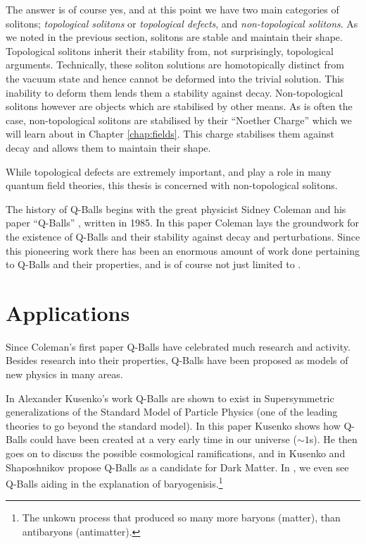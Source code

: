 The answer is of course yes, and at this point we have two main categories of solitons; \textit{topological solitons} or \textit{topological defects}, and \textit{non-topological solitons}. As we noted in the previous section, solitons are stable and maintain their shape. Topological solitons inherit their stability from, not surprisingly, topological arguments. Technically, these soliton solutions are homotopically distinct from the vacuum state \cite{nakahara} and hence cannot be deformed into the trivial solution. This inability to deform them lends them a stability against decay. Non-topological solitons however are objects which are stabilised by other means. As is often the case, non-topological solitons are stabilised by their ``Noether Charge'' which we will learn about in Chapter \ref{chap:fields}. This charge stabilises them against decay and allows them to maintain their shape.

While topological defects are extremely important, and play a role in many quantum field theories, this thesis is concerned with non-topological solitons.

The history of Q-Balls begins with the great physicist Sidney Coleman and his paper ``Q-Balls'' \cite{coleman}, written in 1985. In this paper Coleman lays the groundwork for the existence of Q-Balls and their stability against decay and perturbations. Since this pioneering work there has been an enormous amount of work done pertaining to Q-Balls and their properties, and is of course not just limited to \cite{qball1,qball2,qball3,qball4,qball5,qball6,qball7,qball8,qball9}.

\section{Applications}\label{sec:apps}
Since Coleman's first paper Q-Balls have celebrated much research and activity. Besides research into their properties, Q-Balls have been proposed as models of new physics in many areas.

In Alexander Kusenko's work \cite{SUSY} Q-Balls are shown to exist in Supersymmetric generalizations of the Standard Model of Particle Physics (one of the leading theories to go beyond the standard model). In this paper Kusenko shows how Q-Balls could have been created at a very early time in our universe ($\sim1$s). He then goes on to discuss the possible cosmological ramifications, and in \cite{darkmatter} Kusenko and Shaposhnikov propose Q-Balls as a candidate for Dark Matter. In \cite{baryogen,baryogen2}, we even see Q-Balls aiding in the explanation of baryogenisis.\footnote{The unkown process that produced so many more baryons (matter), than antibaryons (antimatter).}
